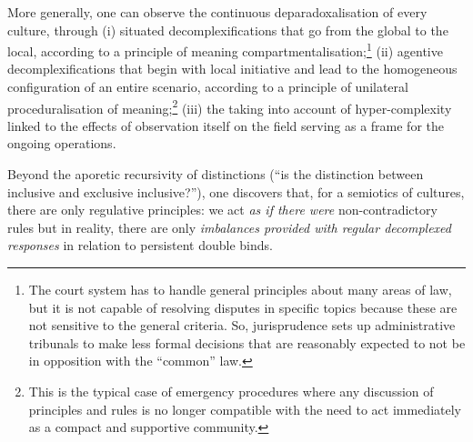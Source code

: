 \documentclass[output=paper]{langscibook}
\begin{document}
More generally, one can observe the continuous deparadoxalisation of every culture, through (i) situated decomplexifications that go from the global to the local, according to a principle of meaning compartmentalisation;\footnote{The court system has to handle general principles about many areas of law, but it is not capable of resolving disputes in specific topics because these are not sensitive to the general criteria. So, jurisprudence sets up administrative tribunals to make less formal decisions that are reasonably expected to not be in opposition with the “common” law.} (ii) agentive decomplexifications that begin with local initiative and lead to the homogeneous configuration of an entire scenario, according to a principle of unilateral proceduralisation of meaning;\footnote{This is the typical case of emergency procedures where any discussion of principles and rules is no longer compatible with the need to act immediately as a compact and supportive community.} (iii) the taking into account of hyper-complexity linked to the effects of observation itself on the field serving as a frame for the ongoing operations. 

Beyond the aporetic recursivity of distinctions (“is the distinction between inclusive and exclusive inclusive?”), one discovers that, for a semiotics of cultures, there are only regulative principles: we act \textit{as if there were} non-contradictory rules but in reality, there are only \textit{imbalances provided with regular decomplexed responses} in relation to persistent double binds. 
\end{document}
